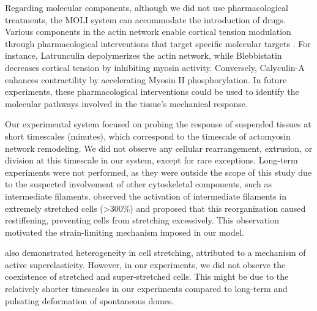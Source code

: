 Regarding molecular components, although we did not use pharmacological treatments, the MOLI system can accommodate the introduction of drugs. Various components in the actin network enable cortical tension modulation through pharmacological interventions that target specific molecular targets \cite{cartagena-rivera2016}. For instance, Latrunculin depolymerizes the actin network, while Blebbistatin decreases cortical tension by inhibiting myosin activity. Conversely, Calyculin-A enhances contractility by accelerating Myosin II phosphorylation. In future experiments, these pharmacological interventions could be used to identify the molecular pathways involved in the tissue's mechanical response.

Our experimental system focused on probing the response of suspended tissues at short timescales (minutes), which correspond to the timescale of actomyosin network remodeling. We did not observe any cellular rearrangement, extrusion, or division at this timescale in our system, except for rare exceptions. Long-term experiments were not performed, as they were outside the scope of this study due to the suspected involvement of other cytoskeletal components, such as intermediate filaments. \citet{latorre2018} observed the activation of intermediate filaments in extremely stretched cells (>300\%) and proposed that this reorganization caused restiffening, preventing  cells from stretching excessively. This observation motivated the strain-limiting mechanism imposed in our model.

\citet{latorre2018}  also demonstrated heterogeneity in cell stretching, attributed to a mechanism of  active superelasticity. However, in our experiments, we did not observe the coexistence of stretched and super-stretched cells. This might be due to the relatively shorter timescales in our experiments compared to long-term and pulsating deformation of spontaneous domes.

